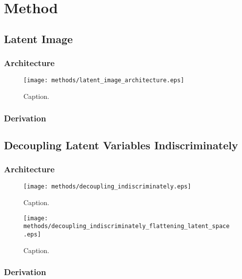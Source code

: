 \chapter{Method}

\label{ch:method}

%
%
%
%
%
\section{Latent Image}
\lipsum[2]
\subsection{Architecture}
\begin{figure}[H]
\centering
\captionsetup{justification=centering}
\texttt{[image: methods/latent\_image\_architecture.eps]}
\caption{Caption.}
\label{fig:latent_image_architecture}
\end{figure}

\subsection{Derivation}

%
%
%
%
%
\section{Decoupling Latent Variables Indiscriminately}
\lipsum[2]
\subsection{Architecture}
\begin{figure}[H]
\centering
\captionsetup{justification=centering}
\texttt{[image: methods/decoupling\_indiscriminately.eps]}
\caption{Caption.}
\label{fig:decoupling_indiscriminately}
\end{figure}

\begin{figure}[H]
\centering
\captionsetup{justification=centering}
\texttt{[image: methods/decoupling\_indiscriminately\_flattening\_latent\_space.eps]}
\caption{Caption.}
\label{fig:decoupling_indiscriminately_flattening_latent_space}
\end{figure}

\subsection{Derivation}



